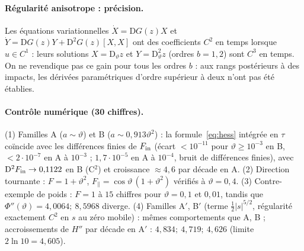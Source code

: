 \documentclass[11pt,a4paper]{article}
\theoremstyle{remark}
\newcommand{\vth}{\vartheta}
\newcommand{\D}{\mathrm D}
\begin{document}
\paragraph{Régularité anisotrope : précision.} Les équations variationnelles $\dot X=\D G(z)X$ et $\dot Y=\D G(z)Y+\D^2G(z)[X,X]$ ont des coefficients $C^2$ en temps lorsque $u\in C^1$ : leurs solutions $X=\D_\vth z$ et $Y=\D^2_\vth z$ (ordres $b=1,2$) sont $C^3$ en temps. On ne revendique pas ce gain pour tous les ordres $b$ : aux rangs postérieurs à des impacts, les dérivées paramétriques d'ordre supérieur à deux n'ont pas été établies.

\paragraph{Contrôle numérique (30 chiffres).} (1) Familles A ($a\sim\vth$) et B ($a\sim0{,}913\vth^2$) : la formule~\eqref{eq:hess} intégrée en $\tau$ coïncide avec les différences finies de $F_{\rm in}$ (écart $<10^{-11}$ pour $\vth\ge10^{-3}$ en B, $<2\cdot10^{-7}$ en A à $10^{-3}$ ; $1{,}7\cdot10^{-5}$ en A à $10^{-4}$, bruit de différences finies), avec $\D^2F_{\rm in}\to0{,}1122$ en B (C$^2$) et croissance $\approx4{,}6$ par décade en A. (2) Direction tournante : $F=1+\vth^2$, $F_\parallel=\cos\vth\,(1+\vth^2)$ vérifiés à $\vth=0{,}4$. (3) Contre-exemple de poids : $F=1$ à $15$ chiffres pour $\vth=0{,}1$ et $0{,}01$, tandis que $\Phi''(\vth)=4{,}0064;\ 8{,}5968$ diverge. (4) Familles A$'$, B$'$ (terme $\frac12\lvert s\rvert^{5/2}$, régularité exactement $C^2$ en $s$ au zéro mobile) : mêmes comportements que A, B ; accroissements de $H''$ par décade en A$'$ : $4{,}834;\ 4{,}719;\ 4{,}626$ (limite $2\ln10=4{,}605$).
\end{document}
